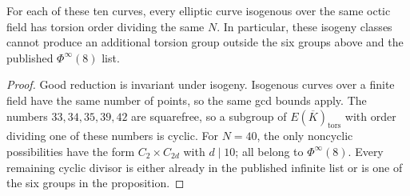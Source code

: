 \begin{corollary}\label{cor:octic-known-isogeny-bounds}
For each of these ten curves, every elliptic curve isogenous over
the same octic field has torsion order dividing the same $N$.
In particular, these isogeny classes cannot produce an additional
torsion group outside the six groups above and the published
$\Phi^\infty(8)$ list.
\end{corollary}
\begin{proof}
Good reduction is invariant under isogeny. Isogenous curves over
a finite field have the same number of points, so the same gcd
bounds apply. The numbers $33,34,35,39,42$ are squarefree, so a
subgroup of $E(\overline K)_{\mathrm{tors}}$ with order dividing
one of these numbers is cyclic. For $N=40$, the only noncyclic
possibilities have the form $C_2\times C_{2d}$ with $d\mid10$;
all belong to $\Phi^\infty(8)$. Every remaining cyclic divisor
is either already in the published infinite list or is one of
the six groups in the proposition.
\end{proof}

